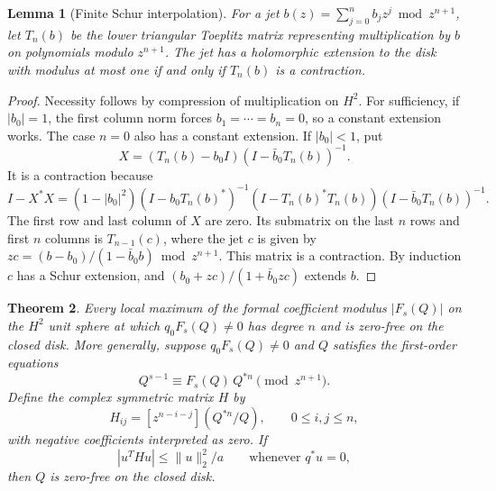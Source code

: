 \documentclass[11pt]{article}
\newtheorem{theorem}{Theorem}
\newtheorem{lemma}[theorem]{Lemma}
\begin{document}
\begin{lemma}[Finite Schur interpolation]\label{lem:general-schur-interp}
For a jet \(b(z)=\sum_{j=0}^n b_jz^j\bmod z^{n+1}\), let
\(T_n(b)\) be the lower triangular Toeplitz matrix representing
multiplication by \(b\) on polynomials modulo \(z^{n+1}\).
The jet has a holomorphic extension to the disk with
modulus at most one if and only if \(T_n(b)\) is a contraction.
\end{lemma}

\begin{proof}
Necessity follows by compression of multiplication on \(H^2\).
For sufficiency, if \(|b_0|=1\), the first column norm forces
\(b_1=\cdots=b_n=0\), so a constant extension works. The case
\(n=0\) also has a constant extension. If \(|b_0|<1\), put
\[
 X=(T_n(b)-b_0 I)(I-\bar b_0 T_n(b))^{-1}.
\]
It is a contraction because
\[
 I-X^*X=(1-|b_0|^2)
 (I-b_0 T_n(b)^*)^{-1}(I-T_n(b)^*T_n(b))
 (I-\bar b_0 T_n(b))^{-1}.
\]
The first row and last column of \(X\) are zero. Its
submatrix on the last \(n\) rows and first \(n\) columns
is \(T_{n-1}(c)\), where the jet \(c\) is given by
\(zc=(b-b_0)/(1-\bar b_0 b)\bmod z^{n+1}\).
This matrix is a contraction. By induction \(c\) has a Schur
extension, and \((b_0+zc)/(1+\bar b_0 zc)\) extends \(b\).
\end{proof}

\begin{theorem}\label{thm:general-hessian-schur}
Every local maximum of the formal coefficient modulus
\(|F_s(Q)|\) on the \(H^2\) unit sphere at which \(q_0F_s(Q)\ne0\)
has degree \(n\) and is zero-free on the closed disk. More generally,
suppose \(q_0F_s(Q)\ne0\) and \(Q\) satisfies the first-order equations
\[
 Q^{s-1}\equiv F_s(Q)\,Q^{*n}\pmod {z^{n+1}}.
\]
Define the complex symmetric matrix \(H\) by
\[
 H_{ij}=[z^{n-i-j}](Q^{*n}/Q),\qquad 0\le i,j\le n,
\]
with negative coefficients interpreted as zero. If
\begin{equation}\label{eq:general-hankel-hessian}
 |u^T H u|\le \|u\|_2^2/a\qquad \text{whenever }q^*u=0,
\end{equation}
then \(Q\) is zero-free on the closed disk.
\end{theorem}
\end{document}
